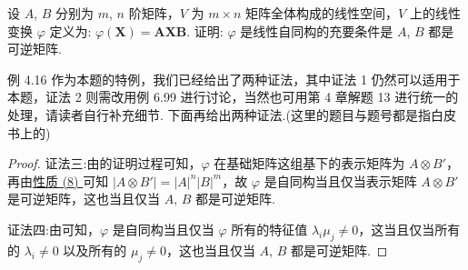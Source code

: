 \documentclass[../../main.tex]{subfiles}
\begin{document}
\begin{example}
设 $A$, $B$ 分别为 $m$, $n$ 阶矩阵，$V$ 为 $m\times n$ 矩阵全体构成的线性空间，$V$ 上的线性变换 $\varphi$ 定义为: $\varphi(\boldsymbol{X}) = \boldsymbol{A}\boldsymbol{X}\boldsymbol{B}$. 证明: $\varphi$ 是线性自同构的充要条件是 $A$, $B$ 都是可逆矩阵.
\end{example}
\begin{remark}
例 4.16 作为本题的特例，我们已经给出了两种证法，其中证法 1 仍然可以适用于本题，证法 2 则需改用例 6.99 进行讨论，当然也可用第 4 章解题 13 进行统一的处理，请读者自行补充细节. 下面再给出两种证法.(这里的题目与题号都是指白皮书上的)
\end{remark}
\begin{proof}
{\color{blue}证法三:}由的证明过程可知，$\varphi$ 在基础矩阵这组基下的表示矩阵为 $A\otimes B'$，再由\hyperref[矩阵的Kronecker积的基本性质(8)]{性质 (8) }可知 $|A\otimes B'| = |A|^n|B|^m$，故 $\varphi$ 是自同构当且仅当表示矩阵 $A\otimes B'$ 是可逆矩阵，这也当且仅当 $A$, $B$ 都是可逆矩阵.

{\color{blue}证法四:}由可知，$\varphi$ 是自同构当且仅当 $\varphi$ 所有的特征值 $\lambda_i\mu_j\neq 0$，这当且仅当所有的 $\lambda_i\neq 0$ 以及所有的 $\mu_j\neq 0$，这也当且仅当 $A$, $B$ 都是可逆矩阵.
\end{proof}
\end{document}
